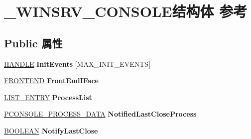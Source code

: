 \hypertarget{struct___w_i_n_s_r_v___c_o_n_s_o_l_e}{}\section{\+\_\+\+W\+I\+N\+S\+R\+V\+\_\+\+C\+O\+N\+S\+O\+L\+E结构体 参考}
\label{struct___w_i_n_s_r_v___c_o_n_s_o_l_e}
\subsection*{Public 属性}
\begin{DoxyCompactItemize}
\item 
\mbox{\label{struct___w_i_n_s_r_v___c_o_n_s_o_l_e_ab7125f34da47ee04b8bb260105076410}} 
\hyperlink{interfacevoid}{H\+A\+N\+D\+LE} {\bfseries Init\+Events} \mbox{[}M\+A\+X\+\_\+\+I\+N\+I\+T\+\_\+\+E\+V\+E\+N\+TS\mbox{]}
\item 
\mbox{\label{struct___w_i_n_s_r_v___c_o_n_s_o_l_e_a5e3e0f45287f1a118c8208eeb32e7b07}} 
\hyperlink{struct___f_r_o_n_t_e_n_d}{F\+R\+O\+N\+T\+E\+ND} {\bfseries Front\+End\+I\+Face}
\item 
\mbox{\label{struct___w_i_n_s_r_v___c_o_n_s_o_l_e_ad35795f0eac9bf59cf1c7f1d0bc98155}} 
\hyperlink{struct___l_i_s_t___e_n_t_r_y}{L\+I\+S\+T\+\_\+\+E\+N\+T\+RY} {\bfseries Process\+List}
\item 
\mbox{\label{struct___w_i_n_s_r_v___c_o_n_s_o_l_e_a67eca9588439eeb34b8c4c0734995285}} 
\hyperlink{struct___c_o_n_s_o_l_e___p_r_o_c_e_s_s___d_a_t_a}{P\+C\+O\+N\+S\+O\+L\+E\+\_\+\+P\+R\+O\+C\+E\+S\+S\+\_\+\+D\+A\+TA} {\bfseries Notified\+Last\+Close\+Process}
\item 
\mbox{\label{struct___w_i_n_s_r_v___c_o_n_s_o_l_e_a897b233cbbd0ff0e7d8d7c8487272cbd}} 
\hyperlink{_processor_bind_8h_a112e3146cb38b6ee95e64d85842e380a}{B\+O\+O\+L\+E\+AN} {\bfseries Notify\+Last\+Close}
\item 
\mbox{\label{struct___w_i_n_s_r_v___c_o_n_s_o_l_e_a013f2eac996da397ab18a90d50456f4c}} 

\end{DoxyCompactItemize}
